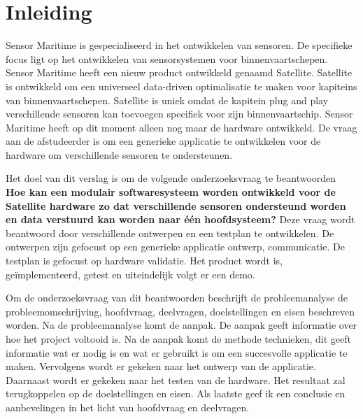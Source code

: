 \chapter{Inleiding}
Sensor Maritime is gespecialiseerd in het ontwikkelen van sensoren. De specifieke focus ligt op het ontwikkelen van sensorsystemen voor binnenvaartschepen. Sensor Maritime heeft een nieuw product ontwikkeld genaamd Satellite. Satellite is ontwikkeld om een universeel data-driven optimalisatie te maken voor kapiteins van binnenvaartschepen. Satellite is uniek omdat de kapitein plug and play verschillende sensoren kan toevoegen specifiek voor zijn binnenvaartschip. Sensor Maritime heeft op dit moment alleen nog maar de hardware ontwikkeld. De vraag aan de afstudeerder is om een generieke applicatie te ontwikkelen voor de hardware om verschillende sensoren te ondersteunen.\newline

\noindent Het doel van dit verslag is om de volgende onderzoeksvraag te beantwoorden \textbf{Hoe kan een modulair softwaresysteem worden ontwikkeld voor de Satellite hardware zo dat verschillende sensoren ondersteund worden en data verstuurd kan worden naar één hoofdsysteem?}
Deze vraag wordt beantwoord door verschillende ontwerpen en een testplan te ontwikkelen. De ontwerpen zijn gefocust op een generieke applicatie ontwerp, communicatie. De testplan is gefocust op hardware validatie. Het product wordt is, geïmplementeerd, getest en uiteindelijk volgt er een demo. \newline

\noindent Om de onderzoeksvraag van dit beantwoorden beschrijft de probleemanalyse de probleemomschrijving, hoofdvraag, deelvragen, doelstellingen en eisen beschreven worden. Na de probleemanalyse komt de aanpak. De aanpak geeft informatie over hoe het project voltooid is. Na de aanpak komt de methode technieken, dit geeft informatie wat er nodig is en wat er gebruikt is om een succesvolle applicatie te maken. Vervolgens wordt er gekeken naar het ontwerp van de applicatie. Daarnaast wordt er gekeken naar het testen van de hardware. Het resultaat zal terugkoppelen op de doelstellingen en eisen. Als laatste geef ik een conclusie en aanbevelingen in het licht van hoofdvraag en deelvragen.